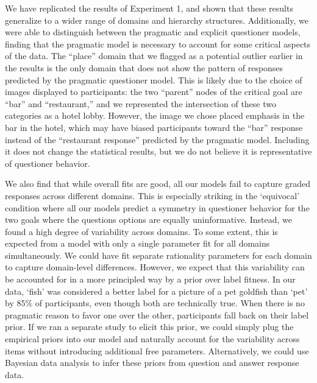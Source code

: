 \documentclass[12pt, floatsintext, jou]{apa6}
\begin{document}
We have replicated the results of Experiment 1, and shown that these results generalize to a wider range of domains and hierarchy structures. Additionally, we were able to distinguish between the pragmatic and explicit questioner models, finding that the pragmatic model is necessary to account for some critical aspects of the data. The ``place'' domain that we flagged as a potential outlier earlier in the results is the only domain that does not show the pattern of responses predicted by the pragmatic questioner model. This is likely due to the choice of images displayed to participants: the two ``parent'' nodes of the critical goal are ``bar'' and ``restaurant,'' and we represented the intersection of these two categories as a hotel lobby. However, the image we chose placed emphasis in the bar in the hotel, which may have biased participants toward the ``bar'' response instead of the ``restaurant response'' predicted by the pragmatic model. Including it does not change the statistical results, but we do not believe it is representative of questioner behavior. 

We also find that while overall fits are good, all our models fail to capture graded responses across different domains. This is especially striking in the `equivocal' condition where all our models predict a symmetry in questioner behavior for the two goals where the questions options are equally uninformative. Instead, we found a high degree of variability across domains. To some extent, this is expected from a model with only a single parameter fit for all domains simultaneously. We could have fit separate rationality parameters for each domain to capture domain-level differences. However, we expect that this variability can be accounted for in a more principled way by a prior over label fitness. In our data, `fish' was considered a better label for a picture of a pet goldfish than `pet' by 85\% of participants, even though both are technically true. When there is no pragmatic reason to favor one over the other, participants fall back on their label prior. If we ran a separate study to elicit this prior, we could simply plug the empirical priors into our model and naturally account for the variability across items without introducing additional free parameters. Alternatively, we could use Bayesian data analysis to infer these priors from question and answer response data. 
\end{document}
